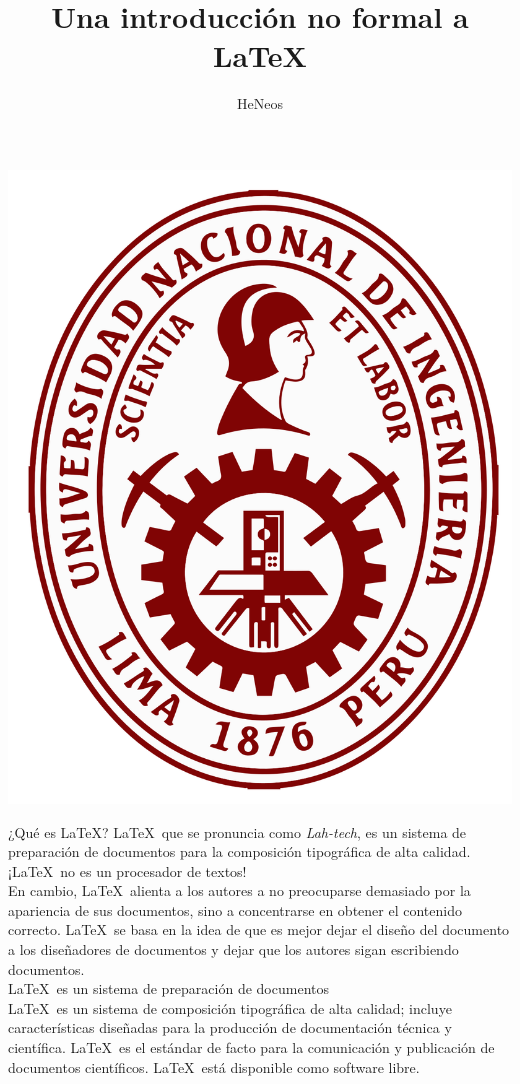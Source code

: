 \documentclass[11pt]{beamer}
\author{HeNeos}
\title{Una introducción no formal a \LaTeX}
\institute[UNI]{Universidad Nacional de Ingeniería}
\begin{document}
\begin{frame}
\includegraphics[scale=0.05]{UNI}
\titlepage
\end{frame}
\begin{frame}{¿Qué es \LaTeX ?}
\LaTeX \, que se pronuncia como \textit{Lah-tech}, es un sistema de preparación de documentos para la composición tipográfica de alta calidad.\\[10pt]
{\LARGE ¡\LaTeX \, no es un procesador de textos!}\\[4pt]
En cambio, \LaTeX \, alienta a los autores a no preocuparse demasiado por la apariencia de sus documentos, sino a concentrarse en obtener el contenido correcto. \LaTeX \, se basa en la idea de que es mejor dejar el diseño del documento a los diseñadores de documentos y dejar que los autores sigan escribiendo documentos.\\[10pt]
{\LARGE \LaTeX \, es un sistema de preparación de documentos}\\[4pt]
\LaTeX \, es un sistema de composición tipográfica de alta calidad; incluye características diseñadas para la producción de documentación técnica y científica. \LaTeX \, es el estándar de facto para la comunicación y publicación de documentos científicos. \LaTeX \, está disponible como software libre.
\end{frame}
\end{document}
